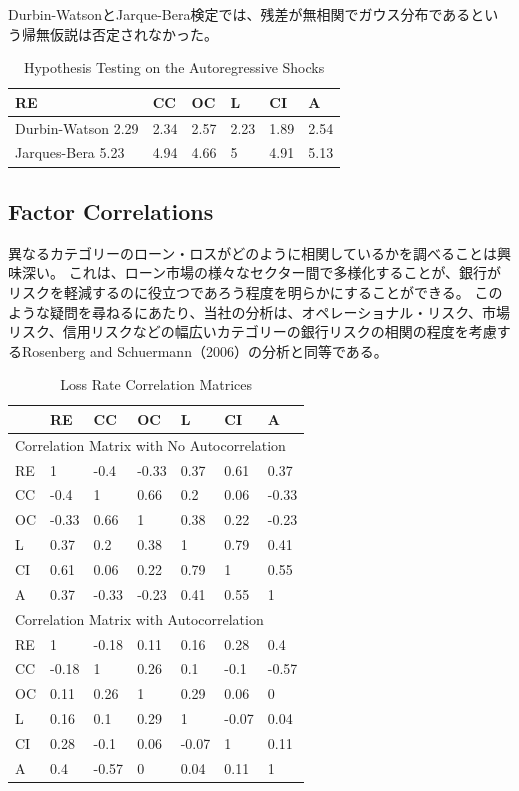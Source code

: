 \documentclass[a4j,12pt]{jarticle}
\begin{document}
Durbin-WatsonとJarque-Bera検定では、残差が無相関でガウス分布であるという帰無仮説は否定されなかった。
\begin{table}[H]
\centering
\caption{Hypothesis Testing on the Autoregressive Shocks}
\begin{tabular}{|l|l|l|l|l|l|}
\hline
RE                 & CC   & OC   & L    & CI   & A    \\ \hline
Durbin-Watson 2.29 & 2.34 & 2.57 & 2.23 & 1.89 & 2.54 \\ \hline
Jarques-Bera 5.23  & 4.94 & 4.66 & 5    & 4.91 & 5.13 \\ \hline
\end{tabular}
\end{table}
\subsection{Factor Correlations}
異なるカテゴリーのローン・ロスがどのように相関しているかを調べることは興味深い。 これは、ローン市場の様々なセクター間で多様化することが、銀行がリスクを軽減するのに役立つであろう程度を明らかにすることができる。 このような疑問を尋ねるにあたり、当社の分析は、オペレーショナル・リスク、市場リスク、信用リスクなどの幅広いカテゴリーの銀行リスクの相関の程度を考慮するRosenberg and Schuermann（2006）の分析と同等である。
\begin{table}[H]
\centering
\caption{Loss Rate Correlation Matrices}
\begin{tabular}{|l|l|l|l|l|l|l|}
\hline
     & RE      & CC      & OC      & L       & CI      & A       \\ \hline
\multicolumn{7}{|l|}{Correlation Matrix with No Autocorrelation} \\ \hline
RE   & 1       & -0.4    & -0.33   & 0.37    & 0.61    & 0.37    \\ \hline
CC   & -0.4    & 1       & 0.66    & 0.2     & 0.06    & -0.33   \\ \hline
OC   & -0.33   & 0.66    & 1       & 0.38    & 0.22    & -0.23   \\ \hline
L    & 0.37    & 0.2     & 0.38    & 1       & 0.79    & 0.41    \\ \hline
CI   & 0.61    & 0.06    & 0.22    & 0.79    & 1       & 0.55    \\ \hline
A    & 0.37    & -0.33   & -0.23   & 0.41    & 0.55    & 1       \\ \hline
\multicolumn{7}{|l|}{Correlation Matrix with Autocorrelation}    \\ \hline
RE   & 1       & -0.18   & 0.11    & 0.16    & 0.28    & 0.4     \\ \hline
CC   & -0.18   & 1       & 0.26    & 0.1     & -0.1    & -0.57   \\ \hline
OC   & 0.11    & 0.26    & 1       & 0.29    & 0.06    & 0       \\ \hline
L    & 0.16    & 0.1     & 0.29    & 1       & -0.07   & 0.04    \\ \hline
CI   & 0.28    & -0.1    & 0.06    & -0.07   & 1       & 0.11    \\ \hline
A    & 0.4     & -0.57   & 0       & 0.04    & 0.11    & 1       \\ \hline
\end{tabular}
\end{table}
\end{document}
